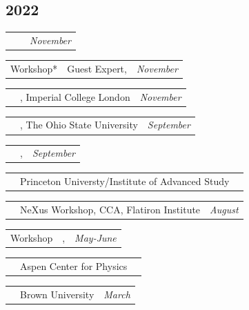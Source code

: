\documentclass[10pt,a4paper, roman]{moderncv}
\makeatletter
\renewcommand*{\cvitemwithcomment}[3]{%
\parbox{\textwidth}{%
\begin{tabularx}{\textwidth}{@{} p{1.0in} X r @{}} #1 & #2 & \textit{#3} \end{tabularx}%
}%
}
\newcommand{\chref}[3][mutedblue]{\href{#2}{\color{#1}{#3}}}
\newcommand{\chrefccs}[2]{\chref[mutedred]{https://cyril-creque.github.io/files/#1}{#2}}
\makeatother
\begin{document}
\subsection{2022}
\cvitemwithcomment{\chrefccs{talks/NSBP_Conference_2022.pdf}{Conference}}{\chref[mutedblue]{https://nsbp.org/page/2022NSBPConferenceSummary}{NSBP Annual Conference}}{November}
\cvitemwithcomment{Workshop*}{Guest Expert, \chref[mutedblue]{https://inspirehep.net/seminars/2170834}{Cosmology Talks Parity-Violation Mini-Workshop}}{November}
\cvitemwithcomment{\chrefccs{talks/Imperial_College_Seminar.pdf}{Seminar*}}{\chref[mutedblue]{https://www.imperial.ac.uk/events/154733/theory-group-seminar-cyril-creque-sarbinowski-chern-simons-gravity-and-neutrino-self-interactions/}{Theory Group Seminar}, Imperial College London}{November}
\cvitemwithcomment{\chrefccs{talks/OSU_Lunch_Talks.pdf}{Talk*}}{\chref[mutedblue]{https://ccapp.osu.edu/events/astroparticle-lunch-09302022}{AstroParticle Lunch}, The Ohio State University}{September}
\cvitemwithcomment{\chrefccs{talks/PU-IAS_Lunch_Talks.pdf}{Talk}}{\chref[mutedblue]{https://www.ias.edu/sns/events/institute-advanced-studyprinceton-university-early-universecosmology-lunch-discussion-47}{Early Universe/Cosmology Lunch Discussion}, }{September}
\cvitemwithcomment{}{Princeton Universty/Institute of Advanced Study}{}
\cvitemwithcomment{\chrefccs{talks/NeXus_2022.pdf}{Workshop$^\dagger$}}{NeXus Workshop, CCA, Flatiron Institute}{August}
\cvitemwithcomment{Workshop}{\chref[mutedblue]{https://aspenphys.org/summer/past-workshops/}{Large-Scale Structure Cosmology beyond 2-Point Statistics}, }{May-June}
\cvitemwithcomment{}{Aspen Center for Physics}{}
\cvitemwithcomment{\chrefccs{talks/Electromagnetic_Charge.pdf}{Seminar*}}{Brown University}{March}
\end{document}
